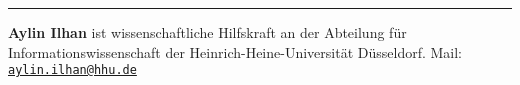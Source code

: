 \begin{center}\rule{0.5\linewidth}{\linethickness}\end{center}

\textbf{Aylin Ilhan} ist wissenschaftliche Hilfskraft an der Abteilung
für Informationswissenschaft der Heinrich-Heine-Universität Düsseldorf.
Mail: \href{mailto:aylin.ilhan@hhu.de}{\nolinkurl{aylin.ilhan@hhu.de}}
